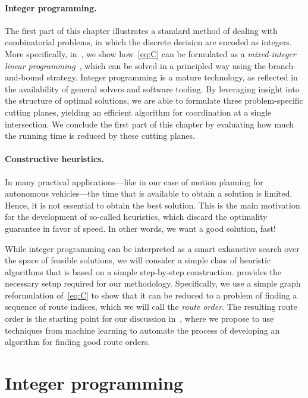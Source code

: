 \documentclass[a4paper]{report}
\theoremstyle{definition}
\theoremstyle{plain}
\begin{document}
\paragraph{Integer programming.}
The first part of this chapter illustrates a standard method of dealing with
combinatorial problems, in which the discrete decision are encoded as integers.
More specifically, in~, we show how~\eqref{eq:C} can
be formulated as a \emph{mixed-integer linear
  programming}~\cite{confortiIntegerProgramming2014}, which can be solved in a
principled way using the branch-and-bound strategy. Integer programming is a
mature technology, as reflected in the availability of general solvers and
software tooling.
%
By leveraging insight into the structure of optimal solutions, we are able to
formulate three problem-specific cutting planes, yielding an efficient
algorithm for coordination at a single intersection.
%
We conclude the first part of this chapter by evaluating how much the running
time is reduced by these cutting planes.

\paragraph{Constructive heuristics.}
In many practical applications---like in our case of motion planning for
autonomous vehicles---the time that is available to obtain a solution is
limited. Hence, it is not essential to obtain the best solution. This is the
main motivation for the development of so-called heuristics, which discard the
optimality guarantee in favor of speed. In other words, we want a good solution,
fast!

While integer programming can be interpreted as a smart exhaustive search over
the space of feasible solutions, we will consider a simple class of heuristic
algorithms that is based on a simple step-by-step construction.
%
 provides the necessary setup required for our
methodology.
%
Specifically, we use a simple graph reformulation of~\eqref{eq:C} to show that
it can be reduced to a problem of finding a sequence of route indices, which we
will call the \emph{route order}. The resulting route order is the starting
point for our discussion in~, where we propose to use
techniques from machine learning to automate the process of developing an
algorithm for finding good route orders.


\section{Integer programming}\label{sec:branch-and-bound}
\end{document}
